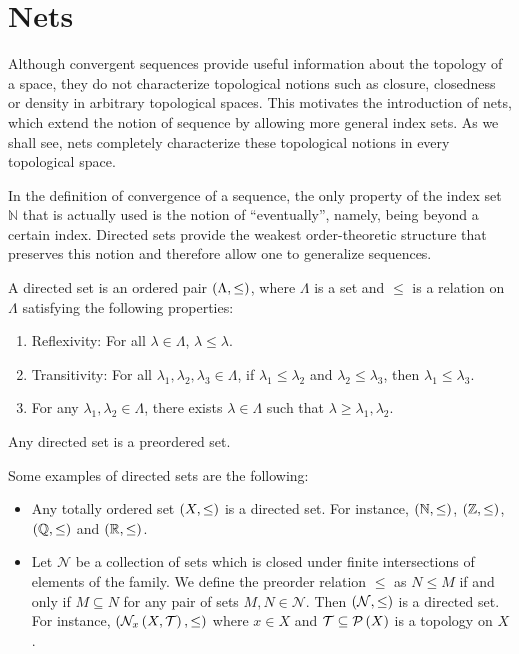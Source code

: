 \section{Nets}

Although convergent sequences provide useful information about the topology of a space, they do not characterize topological notions such as closure, closedness or density in arbitrary topological spaces. This motivates the introduction of nets, which extend the notion of sequence by allowing more general index sets. As we shall see, nets completely characterize these topological notions in every topological space.


In the definition of convergence of a sequence, the only property of the index set $\mathbb{N}$ that is actually used is the notion of ``eventually'', namely, being beyond a certain index. Directed sets provide the weakest order-theoretic structure that preserves this notion and therefore allow one to generalize sequences.

\begin{definition}
  A directed set is an ordered pair $\left(\Lambda,\leq\right)$, where $\Lambda$ is a set and $\leq$ is a relation on $\Lambda$ satisfying the following properties:

  \begin{enumerate}
    \item Reflexivity: For all $\lambda\in\Lambda$, $\lambda\leq\lambda$.
    \item Transitivity: For all $\lambda_1,\lambda_2,\lambda_3\in\Lambda$, if $\lambda_1\leq\lambda_2$ and $\lambda_2\leq\lambda_3$, then $\lambda_1\leq\lambda_3$.
    \item For any $\lambda_1,\lambda_2\in\Lambda$, there exists $\lambda\in\Lambda$ such that $\lambda\geq\lambda_1,\lambda_2$.
  \end{enumerate}
\end{definition}

\begin{remark}
  Any directed set is a preordered set.
\end{remark}

\begin{example}
  Some examples of directed sets are the following:

  \begin{itemize}
    \item Any totally ordered set $\left(X,\leq\right)$ is a directed set. For instance, $\left(\mathbb{N},\leq\right)$, $\left(\mathbb{Z},\leq\right)$, $\left(\mathbb{Q},\leq\right)$ and $\left(\mathbb{R},\leq\right)$.
    \item Let $\mathcal{N}$ be a collection of sets which is closed under finite intersections of elements of the family. We define the preorder relation $\leq$ as $N\leq M$ if and only if $M\subseteq N$ for any pair of sets $M,N\in\mathcal{N}$. Then $\left(\mathcal{N},\leq\right)$ is a directed set. For instance,  $\left(\mathcal{N}_x\left(X,\mathcal{T}\right),\leq\right)$ where $x\in X$ and $\mathcal{T}\subseteq\mathcal{P}\left(X\right)$ is a topology on $X$.
  \end{itemize}
\end{example}

